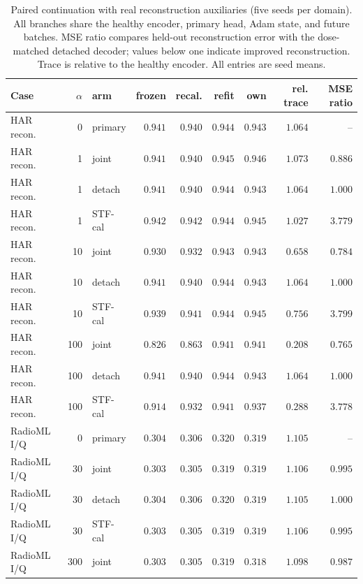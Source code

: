 \begin{table}[t]
\centering
\caption{Paired continuation with real reconstruction auxiliaries (five seeds per domain). All branches share the healthy encoder, primary head, Adam state, and future batches. MSE ratio compares held-out reconstruction error with the dose-matched detached decoder; values below one indicate improved reconstruction. Trace is relative to the healthy encoder. All entries are seed means.}
\label{tab:reconstruction_full}
\footnotesize
\begin{tabular}{lrlrrrrrr}
\toprule
Case & $\alpha$ & arm & frozen & recal. & refit & own & rel. trace & MSE ratio \\
\midrule
HAR recon. & 0 & primary & $0.941$ & $0.940$ & $0.944$ & $0.943$ & $1.064$ & -- \\
HAR recon. & 1 & joint & $0.941$ & $0.940$ & $0.945$ & $0.946$ & $1.073$ & $0.886$ \\
HAR recon. & 1 & detach & $0.941$ & $0.940$ & $0.944$ & $0.943$ & $1.064$ & $1.000$ \\
HAR recon. & 1 & STF-cal & $0.942$ & $0.942$ & $0.944$ & $0.945$ & $1.027$ & $3.779$ \\
HAR recon. & 10 & joint & $0.930$ & $0.932$ & $0.943$ & $0.943$ & $0.658$ & $0.784$ \\
HAR recon. & 10 & detach & $0.941$ & $0.940$ & $0.944$ & $0.943$ & $1.064$ & $1.000$ \\
HAR recon. & 10 & STF-cal & $0.939$ & $0.941$ & $0.944$ & $0.945$ & $0.756$ & $3.799$ \\
HAR recon. & 100 & joint & $0.826$ & $0.863$ & $0.941$ & $0.941$ & $0.208$ & $0.765$ \\
HAR recon. & 100 & detach & $0.941$ & $0.940$ & $0.944$ & $0.943$ & $1.064$ & $1.000$ \\
HAR recon. & 100 & STF-cal & $0.914$ & $0.932$ & $0.941$ & $0.937$ & $0.288$ & $3.778$ \\
\midrule
RadioML I/Q & 0 & primary & $0.304$ & $0.306$ & $0.320$ & $0.319$ & $1.105$ & -- \\
RadioML I/Q & 30 & joint & $0.303$ & $0.305$ & $0.319$ & $0.319$ & $1.106$ & $0.995$ \\
RadioML I/Q & 30 & detach & $0.304$ & $0.306$ & $0.320$ & $0.319$ & $1.105$ & $1.000$ \\
RadioML I/Q & 30 & STF-cal & $0.303$ & $0.305$ & $0.319$ & $0.319$ & $1.106$ & $0.995$ \\
RadioML I/Q & 300 & joint & $0.303$ & $0.305$ & $0.319$ & $0.318$ & $1.098$ & $0.987$ \\

\end{tabular}
\end{table}
